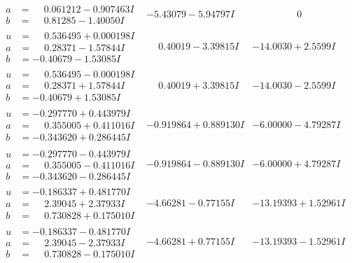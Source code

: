 \documentclass[1p]{elsarticle_modified}
\theoremstyle{definition}
\begin{document}
$$\begin{array}{c|c|c}
\begin{aligned}
a &= \phantom{-}0.061212 - 0.907463 I \\
b &= \phantom{-}0.81285 - 1.40050 I\end{aligned}
 & -5.43079 - 5.94797 I & \phantom{-0.000000 } 0 \\ \hline\begin{aligned}
u &= \phantom{-}0.536495 + 0.000198 I \\
a &= \phantom{-}0.28371 - 1.57844 I \\
b &= -0.40679 - 1.53085 I\end{aligned}
 & \phantom{-}0.40019 - 3.39815 I & -14.0030 + 2.5599 I \\ \hline\begin{aligned}
u &= \phantom{-}0.536495 - 0.000198 I \\
a &= \phantom{-}0.28371 + 1.57844 I \\
b &= -0.40679 + 1.53085 I\end{aligned}
 & \phantom{-}0.40019 + 3.39815 I & -14.0030 - 2.5599 I \\ \hline\begin{aligned}
u &= -0.297770 + 0.443979 I \\
a &= \phantom{-}0.355005 + 0.411016 I \\
b &= -0.343620 + 0.286445 I\end{aligned}
 & -0.919864 + 0.889130 I & -6.00000 - 4.79287 I \\ \hline\begin{aligned}
u &= -0.297770 - 0.443979 I \\
a &= \phantom{-}0.355005 - 0.411016 I \\
b &= -0.343620 - 0.286445 I\end{aligned}
 & -0.919864 - 0.889130 I & -6.00000 + 4.79287 I \\ \hline\begin{aligned}
u &= -0.186337 + 0.481770 I \\
a &= \phantom{-}2.39045 + 2.37933 I \\
b &= \phantom{-}0.730828 + 0.175010 I\end{aligned}
 & -4.66281 - 0.77155 I & -13.19393 + 1.52961 I \\ \hline\begin{aligned}
u &= -0.186337 - 0.481770 I \\
a &= \phantom{-}2.39045 - 2.37933 I \\
b &= \phantom{-}0.730828 - 0.175010 I\end{aligned}
 & -4.66281 + 0.77155 I & -13.19393 - 1.52961 I \\ \hline\begin{aligned}

\end{aligned}
\end{array}$$
\end{document}
